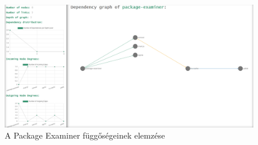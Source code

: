 \begin{figure}[!h]
	\centering
	\includegraphics[scale=0.25]{images/package-examiner.png}
	\caption{A Package Examiner függőségeinek elemzése}
	\label{fig:package-examiner}
\end{figure}
